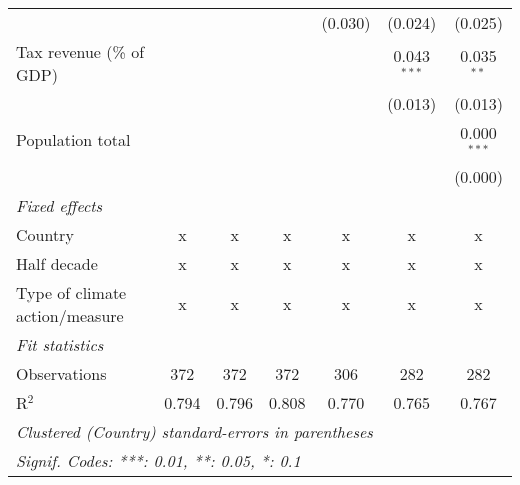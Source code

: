 \begin{tabular}{lcccccc}
                                                              &         &         &                & (0.030)        & (0.024)        & (0.025)\\   
   Tax revenue (\% of GDP)                                    &         &         &                &                & 0.043$^{***}$  & 0.035$^{**}$\\   
                                                              &         &         &                &                & (0.013)        & (0.013)\\   
   Population total                                           &         &         &                &                &                & 0.000$^{***}$\\   
                                                              &         &         &                &                &                & (0.000)\\   
   \emph{Fixed effects}\\
   Country                                                    & x       & x       & x              & x              & x              & x\\  
   Half decade                                                & x       & x       & x              & x              & x              & x\\  
   Type of climate action/measure                             & x       & x       & x              & x              & x              & x\\  
   \midrule \emph{Fit statistics}\\
   Observations                                               & 372     & 372     & 372            & 306            & 282            & 282\\  
   R$^2$                                                      & 0.794   & 0.796   & 0.808          & 0.770          & 0.765          & 0.767\\  
   \midrule
   \multicolumn{7}{l}{\emph{Clustered (Country) standard-errors in parentheses}}\\
   \multicolumn{7}{l}{\emph{Signif. Codes: ***: 0.01, **: 0.05, *: 0.1}}\\
\end{tabular}
\par\endgroup


